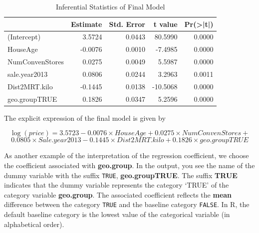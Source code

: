 \documentclass[
]{book}
\newenvironment{Shaded}{\begin{snugshade}}{\end{snugshade}}
\newcommand{\AttributeTok}[1]{\textcolor[rgb]{0.13,0.29,0.53}{#1}}
\newcommand{\DecValTok}[1]{\textcolor[rgb]{0.00,0.00,0.81}{#1}}
\newcommand{\FunctionTok}[1]{\textcolor[rgb]{0.13,0.29,0.53}{\textbf{#1}}}
\newcommand{\NormalTok}[1]{#1}
\newcommand{\OtherTok}[1]{\textcolor[rgb]{0.56,0.35,0.01}{#1}}
\newcommand{\SpecialCharTok}[1]{\textcolor[rgb]{0.81,0.36,0.00}{\textbf{#1}}}
\newcommand{\StringTok}[1]{\textcolor[rgb]{0.31,0.60,0.02}{#1}}
\begin{document}
\begin{Shaded}
\end{Shaded}

\begin{table}

\caption{\label{tab:unnamed-chunk-91}Inferential Statistics of Final Model}
\centering
\begin{tabular}[t]{l|r|r|r|r}
\hline
  & Estimate & Std. Error & t value & Pr(>|t|)\\
\hline
(Intercept) & 3.5724 & 0.0443 & 80.5990 & 0.0000\\
\hline
HouseAge & -0.0076 & 0.0010 & -7.4985 & 0.0000\\
\hline
NumConvenStores & 0.0275 & 0.0049 & 5.5987 & 0.0000\\
\hline
sale.year2013 & 0.0806 & 0.0244 & 3.2963 & 0.0011\\
\hline
Dist2MRT.kilo & -0.1445 & 0.0138 & -10.5068 & 0.0000\\
\hline
geo.groupTRUE & 0.1826 & 0.0347 & 5.2596 & 0.0000\\
\hline
\end{tabular}
\end{table}

The explicit expression of the final model is given by

\[
\log(price) =3.5723 - 0.0076\times HouseAge +0.0275\times NumConvenStores + 
\]
\[   
0.0805\times Sale.year2013 - 0.1445\times Dist2MRT.kilo + 0.1826\times geo.groupTRUE
\]

As another example of the interpretation of the regression coefficient, we choose the coefficient associated with \textbf{geo.group}. In the output, you see the name of the dummy variable with the suffix \texttt{TRUE}, \textbf{geo.groupTRUE}. The suffix \textbf{TRUE} indicates that the dummy variable represents the category `TRUE' of the category variable \textbf{geo.group}. The associated coefficient reflects the \textbf{mean} difference between the category \texttt{TRUE} and the baseline category \texttt{FALSE}. In R, the default baseline category is the lowest value of the categorical variable (in alphabetical order).
\end{document}
